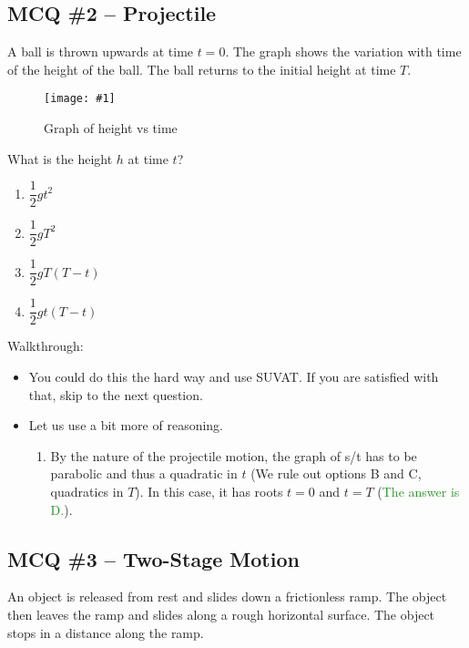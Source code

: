 \documentclass[a4paper,12pt]{article}
\newcommand{\img}[4]{\begin{center}
  \begin{figure}[H]
    \centering
    \texttt{[image: \#1]}
    \caption{#3}
    \label{fig:#4}
  \end{figure}
\end{center}}
\newcommand{\ans}[1]{\textcolor{ForestGreen}{The answer is #1.}}
\newcommand{\outs}[2]{\textcolor{BrickRed}{We rule out options #1 and #2}}
\begin{document}
\let\oldsubsection\subsection
\renewcommand\subsection{\clearpage\oldsubsection}

\pagebreak

\subsection{MCQ \#2 -- Projectile}
A ball is thrown upwards at time $t = 0$. The graph shows the variation with time of the height of the ball. The ball returns to the initial height at time $T$.
\img{ex/1.png}{0.7}{Graph of height vs time}{heightvtime}
What is the height $h$ at time $t$?

\begin{enumerate}[label=\Alph*.]
  \item $\dfrac{1}{2}gt^2$
  \item $\dfrac{1}{2}gT^2$
  \item $\dfrac{1}{2}gT(T - t)$
  \item $\dfrac{1}{2}gt(T - t)$
\end{enumerate}

Walkthrough:
\begin{itemize}
  \item You could do this the hard way and use SUVAT. If you are satisfied with that, skip to the next question.
  \item Let us use a bit more of reasoning.
        \begin{enumerate}
          \item By the nature of the projectile motion, the graph of s/t has to be parabolic and thus a quadratic in $t$ (\outs{B}{C}, quadratics in $T$). In this case, it has roots $t = 0$ and $t = T$ (\ans{D}).

        \end{enumerate}
\end{itemize}

\pagebreak

\subsection{MCQ \#3 -- Two-Stage Motion}

An object is released from rest and slides down a frictionless ramp. The object then leaves the ramp and slides along a rough horizontal surface. The object stops in a distance along the ramp.
\end{document}

